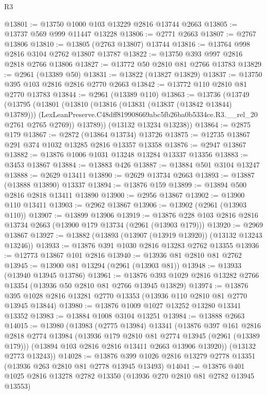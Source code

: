 \begin{lexlean}{R3}
\begin{coremodule}
@13801 := @13750 @1000 @103 @13229 @2816 @13744 @2663
@13805 := @13737 @569 @999 @11447 @13228
@13806 := @2771 @2663
@13807 := @2767 @13806
@13810 := @13805 (@2763 @13807) @13744
@13816 := @13764 @998 @2816 @3104 @2762 @13807 @13787
@13822 := @13750 @393 @997 @2816 @2818 @2766 @13806
@13827 := @13772 @50 @2810 @81 @2766 @13783
@13829 := @2961 (@13389 @50)
@13831 := @13822 (@13827 @13829)
@13837 := @13750 @395 @103 @2816 @2816 @2770 @2663
@13842 := @13772 @110 @2810 @81 @2770 @13783
@13844 := @2961 (@13389 @110)
@13863 := @13736
    (@13749
      (@13795
        (@13801
          (@13810
            (@13816 (@13831 (@13837 (@13842 @13844) @13789)))
            (LexLeanPreserve.C48dff819908669abc5fb26ba0b5334ce.R3.__rel_20 @2761 @2765 @2769))
          @13789))
      (@13132 @13234 @13238))
@13864 := @2875 @179
@13867 := @2872 (@13864 @13734) @13726
@13875 := @12735 @13867 @291 @374 @1032 @13285 @2816 @13357 @13358
@13876 := @2947 @13867
@13882 := @13876 @1006 @1031 @13248 @13284 @13337 @13356
@13883 := @3453 @13867
@13884 := @13883 @426
@13887 := @13884 @501 @3104 @13247
@13888 := @2629 @13411
@13890 := @2629 @13734 @2663
@13893 := @13887 (@13888 @13890) @13337
@13894 := @13876 @159
@13899 := @13894 @500 @2816 @2818 @13411 @13890
@13900 := @2956 @13867
@13902 := @13900 @110 @13411
@13903 := @2962 @13867
@13906 := @13902 (@2961 (@13903 @110))
@13907 := @13899 @13906
@13919 := @13876 @228 @103 @2816 @2816 @13734 @2663 (@13900 @179 @13734 (@2961 (@13903 @179)))
@13920 := @2969 @13867
@13927 := @13882 (@13893 (@13907 (@13919 @13920)) (@13132 @13243 @13246))
@13933 := @13876 @391 @1030 @2816 @13283 @2762 @13355
@13936 := @12773 @13867 @101 @2816
@13940 := @13936 @81 @2810 @81 @2762
@13945 := @13900 @81 @13294 (@2961 (@13903 @81))
@13948 := @13933 (@13940 @13945 @13786)
@13961 := @13876 @393 @1029 @2816 @13282 @2766 @13354 (@13936 @50 @2810 @81 @2766 @13945 @13829)
@13974 := @13876 @395 @1028 @2816 @13281 @2770 @13353 (@13936 @110 @2810 @81 @2770 @13945 @13844)
@13980 := @13876 @1009 @1027 @13252 @13280 @13341 @13352
@13983 := @13884 @1008 @3104 @13251
@13984 := @13888 @2663
@14015 := @13980
    (@13983
      (@2775 @13984)
      @13341
      (@13876
        @397
        @161
        @2816
        @2818
        @2774
        @13984
        (@13936 @179 @2810 @81 @2774 @13945 (@2961 (@13389 @179)))
        (@13894 @103 @2816 @2816 @13411 @2663 @13906 @13920))
      (@13132 @2773 @13243))
@14028 := @13876 @399 @1026 @2816 @13279 @2778 @13351 (@13936 @263 @2810 @81 @2778 @13945 @13493)
@14041 := @13876 @401 @1025 @2816 @13278 @2782 @13350 (@13936 @270 @2810 @81 @2782 @13945 @13553)

\end{coremodule}
\end{lexlean}
